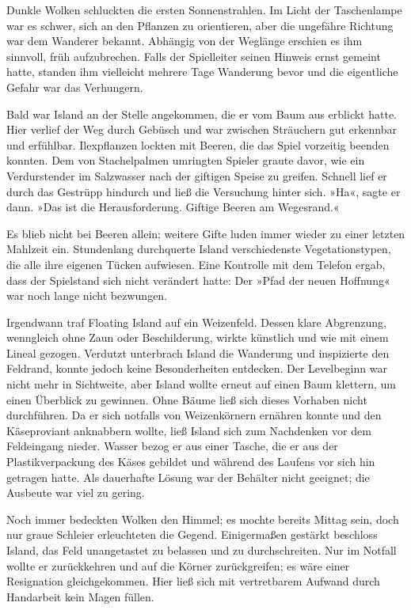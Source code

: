 Dunkle Wolken schluckten die ersten Sonnenstrahlen. Im Licht der Taschenlampe war es schwer, sich an den Pflanzen zu orientieren, aber die ungefähre Richtung war dem Wanderer bekannt. Abhängig von der Weglänge erschien es ihm sinnvoll, früh aufzubrechen. Falls der Spielleiter seinen Hinweis ernst gemeint hatte, standen ihm vielleicht mehrere Tage Wanderung bevor und die eigentliche Gefahr war das Verhungern.

Bald war Island an der Stelle angekommen, die er vom Baum aus erblickt hatte. Hier verlief der Weg durch Gebüsch und war zwischen Sträuchern gut erkennbar und erfühlbar. Ilexpflanzen lockten mit Beeren, die das Spiel vorzeitig beenden konnten. Dem von Stachelpalmen umringten Spieler graute davor, wie ein Verdurstender im Salzwasser nach der giftigen Speise zu greifen. Schnell lief er durch das Gestrüpp hindurch und ließ die Versuchung hinter sich. »Ha«, sagte er dann. »Das ist die Herausforderung. Giftige Beeren am Wegesrand.«

Es blieb nicht bei Beeren allein; weitere Gifte luden immer wieder zu einer letzten Mahlzeit ein. Stundenlang durchquerte Island verschiedenste Vegetationstypen, die alle ihre eigenen Tücken aufwiesen. Eine Kontrolle mit dem Telefon ergab, dass der Spielstand sich nicht verändert hatte: Der »Pfad der neuen Hoffnung« war noch lange nicht bezwungen.

Irgendwann traf Floating Island auf ein Weizenfeld. Dessen klare Abgrenzung, wenngleich ohne Zaun oder Beschilderung, wirkte künstlich und wie mit einem Lineal gezogen. Verdutzt unterbrach Island die Wanderung und inspizierte den Feldrand, konnte jedoch keine Besonderheiten entdecken. Der Levelbeginn war nicht mehr in Sichtweite, aber Island wollte erneut auf einen Baum klettern, um einen Überblick zu gewinnen. Ohne Bäume ließ sich dieses Vorhaben nicht durchführen. Da er sich notfalls von Weizenkörnern ernähren konnte und den Käseproviant anknabbern wollte, ließ Island sich zum Nachdenken vor dem Feldeingang nieder. Wasser bezog er aus einer Tasche, die er aus der Plastikverpackung des Käses gebildet und während des Laufens vor sich hin getragen hatte. Als dauerhafte Lösung war der Behälter nicht geeignet; die Ausbeute war viel zu gering.

Noch immer bedeckten Wolken den Himmel; es mochte bereits Mittag sein, doch nur graue Schleier erleuchteten die Gegend. Einigermaßen gestärkt beschloss Island, das Feld unangetastet zu belassen und zu durchschreiten. Nur im Notfall wollte er zurückkehren und auf die Körner zurückgreifen; es wäre einer Resignation gleichgekommen. Hier ließ sich mit vertretbarem Aufwand durch Handarbeit kein Magen füllen.

